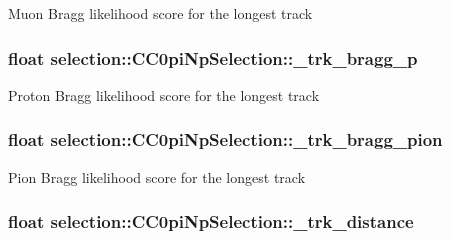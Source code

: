 Muon Bragg likelihood score for the longest track \hypertarget{classselection_1_1CC0piNpSelection_a52d578481ee7dd4fed45f8e3c8ed44da}{
\subsubsection[{\-\_\-trk\-\_\-bragg\-\_\-p}]{\setlength{\rightskip}{0pt plus 5cm}float selection\-::\-C\-C0pi\-Np\-Selection\-::\-\_\-trk\-\_\-bragg\-\_\-p\hspace{0.3cm}{\ttfamily [private]}}}\label{classselection_1_1CC0piNpSelection_a52d578481ee7dd4fed45f8e3c8ed44da}
Proton Bragg likelihood score for the longest track \hypertarget{classselection_1_1CC0piNpSelection_a5371981bb5f02024c2ba1d986541ffd9}{
\subsubsection[{\-\_\-trk\-\_\-bragg\-\_\-pion}]{\setlength{\rightskip}{0pt plus 5cm}float selection\-::\-C\-C0pi\-Np\-Selection\-::\-\_\-trk\-\_\-bragg\-\_\-pion\hspace{0.3cm}{\ttfamily [private]}}}\label{classselection_1_1CC0piNpSelection_a5371981bb5f02024c2ba1d986541ffd9}
Pion Bragg likelihood score for the longest track \hypertarget{classselection_1_1CC0piNpSelection_a0f16777192fbed04bcc67edfdfa67e6b}{
\subsubsection[{\-\_\-trk\-\_\-distance}]{\setlength{\rightskip}{0pt plus 5cm}float selection\-::\-C\-C0pi\-Np\-Selection\-::\-\_\-trk\-\_\-distance\hspace{0.3cm}{\ttfamily [private]}}}\label{classselection_1_1CC0piNpSelection_a0f16777192fbed04bcc67edfdfa67e6b}
